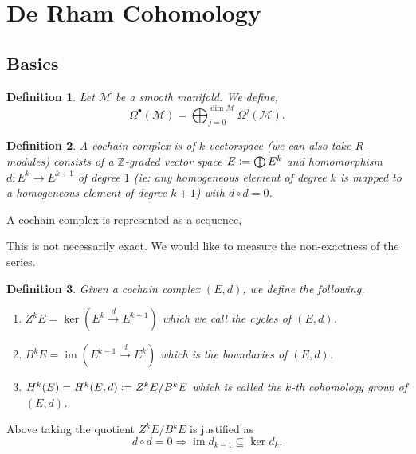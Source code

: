 \documentclass[8pt]{article}
\newtheorem{definition}{Definition}[section]
\DeclareMathOperator{\image}{im}
\newcommand{\defeq}{\vcentcolon=}
\newcommand{\Z}[0]{\mathbb{Z}}
\newcommand{\M}[0]{\mathcal{M}}
\begin{document}
\section{De Rham Cohomology}

\subsection{Basics}

\begin{definition}
  Let $\M$ be a smooth manifold. We define,
  \begin{equation*}
    \Omega^\bullet(\M) = \bigoplus_{j=0}^{\dim\M}\Omega^j(\M).
  \end{equation*}
\end{definition}

\begin{definition}
  A cochain complex is of $k$-vectorspace (we can also take $R$-modules) consists of a $\Z$-graded vector space $E \defeq \bigoplus E^k$ and homomorphism $d:E^k\to E^{k+1}$ of degree $1$ (ie: any homogeneous element of degree $k$ is mapped to a homogeneous element of degree $k+1$) with $d\circ d = 0$.
\end{definition}

A cochain complex is represented as a sequence,
\begin{center}
\end{center}

This is not necessarily exact. We would like to measure the non-exactness of the series. 

\begin{definition}
  Given a cochain complex $(E,d)$, we define the following,
  \begin{enumerate}
    \item $Z^kE = \ker(E^k\stackrel{d}{\to}E^{k+1})$ which we call the cycles of $(E,d)$.
    \item $B^kE = \image(E^{k-1}\stackrel{d}{\to}E^k)$ which is the boundaries of $(E,d)$.
    \item $H^k(E) = H^k(E,d)\defeq Z^kE/B^kE$ which is called the $k$-th cohomology group of $(E,d)$.
  \end{enumerate}
\end{definition}

Above taking the quotient $Z^kE/B^kE$ is justified as 
\begin{equation*}
  d\circ d = 0\Rightarrow \image d_{k-1}\subseteq\ker d_k.
\end{equation*}
\end{document}
